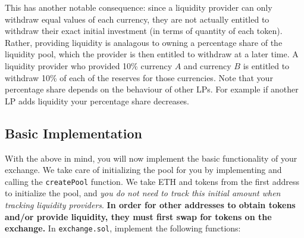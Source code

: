 \documentclass[11pt]{article}
\begin{document}
This has another notable consequence: since a liquidity provider can only withdraw equal values of each currency, they are not actually entitled to withdraw their exact initial investment (in terms of quantity of each token). Rather, providing liquidity is analagous to owning a percentage share of the liquidity pool, which the provider is then entitled to withdraw at a later time. A liquidity provider who provided 10\% currency $A$ and currency $B$ is entitled to withdraw 10\% of each of the reserves for those currencies. Note that your percentage share depends on the behaviour of other LPs. For example if another LP adds liquidity your percentage share decreases.

\subsection{Basic Implementation}
With the above in mind, you will now implement the basic functionality of your exchange. We take care of initializing the pool for you by implementing and calling the \texttt{createPool} function. We take ETH and tokens from the first address to initialize the pool, and \textit{you do not need to track this initial amount when tracking liquidity providers}. \textbf{In order for other addresses to obtain tokens and/or provide liquidity, they must first swap for tokens on the exchange.} In \texttt{exchange.sol}, implement the following functions:
\end{document}
